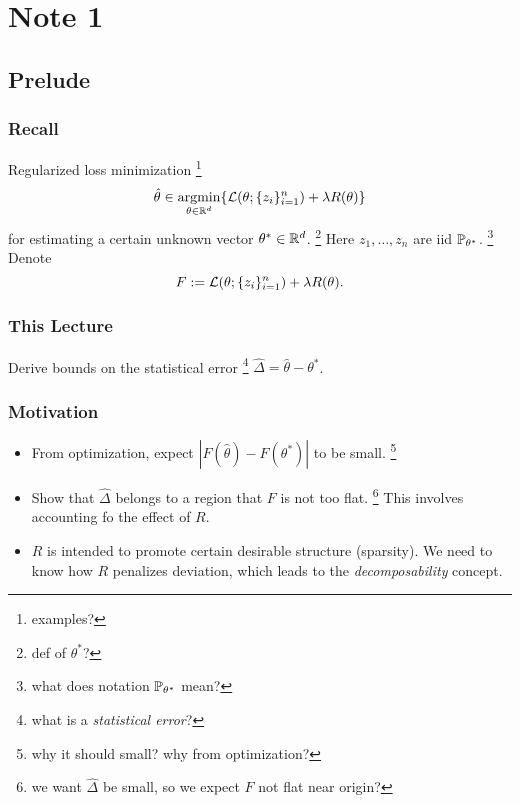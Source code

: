 \section{Note 1}

\subsection{Prelude}

\subsubsection{Recall}

Regularized loss minimization
\footnote{examples?}
\begin{equation}
\hat\theta \in \mathop{\mathrm{argmin}}_{\theta\in{\mathbb{R}}^d} \{\mathcal{L}(\theta;\{z_i\}_{i=1}^n) + \lambda R(\theta)\}
\end{equation}
for estimating a certain unknown vector $\theta^*\in{\mathbb{R}}^d$.
\footnote{def of $\theta^*$?}
Here $z_1,\dots,z_n$ are iid \wrt $\mathbb{P}_{\theta^*}$.
\footnote{what does notation $\mathbb{P}_{\theta^*}$ mean?}
Denote
\begin{equation}
F := \mathcal{L}(\theta;\{z_i\}_{i=1}^n) + \lambda R(\theta).
\end{equation}

\subsubsection{This Lecture}

Derive bounds on the statistical error
\footnote{what is a \emph{statistical error}?}
$\hat\Delta = \hat\theta - \theta^*$.

\subsubsection{Motivation}

\begin{itemize}
    \item From optimization, expect
        $|F(\hat\theta) - F(\theta^*)|$
        to be small.
        \footnote{why it should small? why from optimization?}
    \item Show that $\hat\Delta$ belongs to a region
        that $F$ is not too flat.
        \footnote{we want $\hat\Delta$ be small,
        so we expect $F$ not flat near origin?}
        This involves accounting fo the effect of $R$.
    \item $R$ is intended to promote certain desirable structure (\eg sparsity).
        We need to know how $R$ penalizes deviation,
        which leads to the \emph{decomposability} concept.
\end{itemize}

